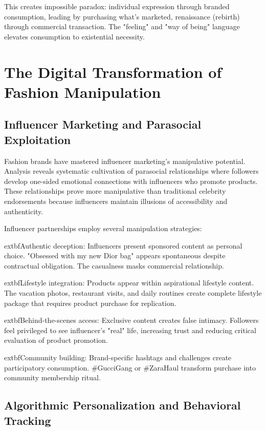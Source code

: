 This creates impossible paradox: individual expression through branded consumption, leading by purchasing what's marketed, renaissance (rebirth) through commercial transaction. The "feeling" and "way of being" language elevates consumption to existential necessity.

\section{The Digital Transformation of Fashion Manipulation}
\label{sec:fashion_digital}

\subsection{Influencer Marketing and Parasocial Exploitation}

Fashion brands have mastered influencer marketing's manipulative potential. Analysis reveals systematic cultivation of parasocial relationships where followers develop one-sided emotional connections with influencers who promote products. These relationships prove more manipulative than traditional celebrity endorsements because influencers maintain illusions of accessibility and authenticity.

Influencer partnerships employ several manipulation strategies:

	extbf{Authentic deception}: Influencers present sponsored content as personal choice. "Obsessed with my new Dior bag" appears spontaneous despite contractual obligation. The casualness masks commercial relationship.

	extbf{Lifestyle integration}: Products appear within aspirational lifestyle content. The vacation photos, restaurant visits, and daily routines create complete lifestyle package that requires product purchase for replication.

	extbf{Behind-the-scenes access}: Exclusive content creates false intimacy. Followers feel privileged to see influencer's "real" life, increasing trust and reducing critical evaluation of product promotion.

	extbf{Community building}: Brand-specific hashtags and challenges create participatory consumption. #GucciGang or #ZaraHaul transform purchase into community membership ritual.

\subsection{Algorithmic Personalization and Behavioral Tracking}


